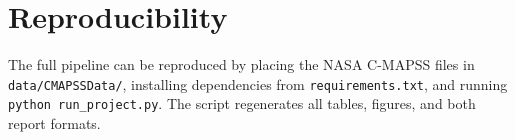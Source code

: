 \documentclass[11pt]{article}
\begin{document}
\section{Reproducibility}
The full pipeline can be reproduced by placing the NASA C-MAPSS files in \texttt{data/CMAPSSData/}, installing dependencies from \texttt{requirements.txt}, and running \texttt{python run\_project.py}. The script regenerates all tables, figures, and both report formats.
\end{document}
